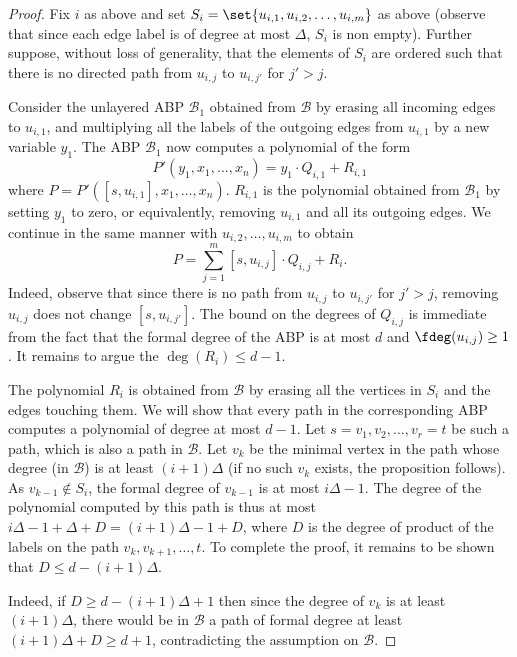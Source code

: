\begin{proof}
Fix $i$ as above and set $S_i = \set{u_{i,1}, u_{i,2}, \ldots, u_{i,m}}$ as above (observe that since each edge label is of degree at most $\Delta$, $S_i$ is non empty). Further suppose, without loss of generality, that the elements of $S_i$ are ordered such that there is no directed path from $u_{i,j}$ to $u_{i,j'}$ for $j' > j$.

Consider the unlayered ABP $\mathcal{B}_1$ obtained from $\mathcal{B}$ by erasing all incoming edges to $u_{i,1}$, and multiplying all the labels of the outgoing edges from $u_{i,1}$ by a new variable $y_1$. The ABP $\mathcal{B}_1$ now computes a polynomial of the form
\[
	P'(y_1, x_1, \ldots, x_n) = y_1 \cdot Q_{i,1} + R_{i,1}
\]
where $P = P'([s,u_{i,1}], x_1, \ldots, x_n)$. $R_{i,1}$ is the polynomial obtained from $\mathcal{B}_1$ by setting $y_1$ to zero, or equivalently, removing $u_{i,1}$ and all its outgoing edges. We continue in the same manner with $u_{i,2}, \ldots, u_{i,m}$ to obtain
\[
P = \sum_{j=1}^m [s,u_{i,j}] \cdot Q_{i,j} + R_i.
\]
Indeed, observe that since there is no path from $u_{i,j}$ to $u_{i,j'}$ for $j' > j$, removing $u_{i,j}$ does not change $[s,u_{i,j'}]$. The bound on the degrees of $Q_{i,j}$ is immediate from the fact that the formal degree of the ABP is at most $d$ and $\fdeg(u_{i,j}) \ge 1$. It remains to argue the $\deg(R_i) \le d-1$.

The polynomial $R_i$ is obtained from $\mathcal{B}$ by erasing all the vertices in $S_i$ and the edges touching them. We will show that every path in the corresponding ABP computes a polynomial of degree at most $d-1$. Let $s=v_1, v_2, \ldots, v_r=t$  be such a path, which is also a path in $\mathcal{B}$. Let $v_k$ be the minimal vertex in the path whose degree (in $\mathcal{B}$) is at least $(i+1)\Delta$
(if no such $v_k$ exists, the proposition follows).
As $v_{k-1} \not \in S_i$, the formal degree of $v_{k-1}$ is at most $i \Delta - 1$.
The degree of the polynomial computed by this path is thus at most $i\Delta - 1 + \Delta + D = (i+1)\Delta - 1 + D$, where $D$ is the degree of product of the labels on the path $v_k, v_{k+1}, \ldots, t$. To complete the proof, it remains to be shown that $D \le d - (i+1)\Delta$.

Indeed, if $D \ge d - (i+1)\Delta + 1$ then since the degree of $v_k$ is at least $(i+1)\Delta$, there would be in $\mathcal{B}$ a path of formal degree at least $(i+1)\Delta +D \ge d + 1$, contradicting the assumption on $\mathcal{B}$.
\end{proof}


